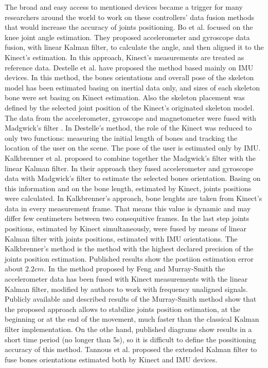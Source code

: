 \documentclass[sensors,article,submit,moreauthors,pdftex,10pt,a4paper]{mdpi}
\begin{document}
The broad and easy access to mentioned devices became a trigger for many researchers around the world to work on these controllers' data fusion methods that would increase the accuracy of joints positioning. Bo et al. \cite{Bo2011a} focused on the knee joint angle estimation. They proposed accelerometer and gyroscope data fusion, with linear Kalman filter, to calculate the angle, and then aligned it to the Kinect’s estimation. In this approach, Kinect's measurements are treated as reference data. Destelle et al. \cite{Destelle2014} have proposed the method based mainly on IMU devices. In this method, the bones orientations and overall pose of the skeleton model has been estimated basing on inertial data only, and sizes of each skeleton bone were set basing on Kinect estimation. Also the skeleton placement was defined by the selected joint position of the Kinect's originated skeleton model. The data from the accelerometer, gyroscope and magnetometer were fused with Madgwick’s filter \cite{Madgwick2011}. In Destelle's method, the role of the Kinect was reduced to only two functions: measuring the initial length of bones and tracking the location of the user on the scene. The pose of the user is estimated only by IMU. Kalkbrenner et al. \cite{Kalkbrenner2014} proposed to combine together the Madgwick’s filter with the linear Kalman filter. In their approach they fused accelerometer and gyroscope data with Madgwick’s filter to estimate the selected bones orientation. Basing on this information and on the bone length, estimated by Kinect, joints positions were calculated. In Kalkbrenner's approach, bone lenghts are taken from Kinect's data in every measurement frame. That means this value is dynamic and may differ few centimeters between two consequitive frames. In the last step joints positions, estimated by Kinect simultaneously, were fused by means of linear Kalman filter with joints positions, estimated with IMU orientations. The Kalkbrenner's method is the method with the highest declared precision of the joints position estimation. Published results show the postiion estimation error about $2.2cm$. In the method proposed by Feng and Murray-Smith \cite{Murray-Smith2014} the accelerometer data has been fused with Kinect measurements with the linear Kalman filter, modified by authors to work with frequency unaligned signals. Publicly available and described results of the Murray-Smith method show that the proposed approach allows to stabilize joints position estimation, at the beginning or at the end of the movement, much faster than the classical Kalman filter implementation. On the othe hand, published diagrams show results in a short time period (no longer than 5s), so it is difficult to define the possitioning accuracy of this method. Tannous et al. \cite{Tannous2016} proposed the extended Kalman filter to fuse bones orientations estimated both by Kinect and IMU devices. 
\end{document}
